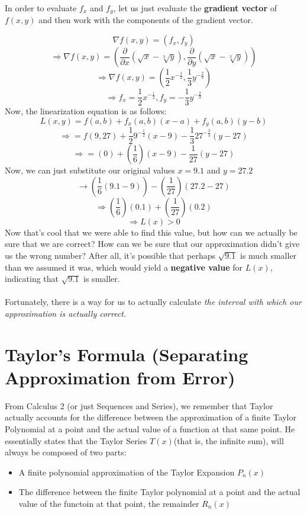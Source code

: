 \documentclass{report}
\begin{document}
\begin{sloppypar}
In order to evaluate $f_{x}$ and $ f_{y}$, let us
just evaluate the \textbf{gradient vector} of
$ f(x,y)$ and then work with the components
of the gradient vector.

\[ \nabla f(x,y) = \left( f_{x}, f_{y} \right)\]
\[ \Rightarrow \nabla f(x,y) = \left( \frac{\partial}{\partial x} \left( \sqrt{x} -
      \sqrt[3]{y} \right), \frac{\partial}{\partial y}
    \left( \sqrt{x} - \sqrt[3]{y} \right)\right)\]
\[ \Rightarrow \nabla f(x,y) =
  \left( \frac{1}{2}x^{-\frac{1}{2}},
    \frac{1}{3}y^{-\frac{2}{3}}\right)\]
\[ \Rightarrow f_{x} = \frac{1}{2}x^{-\frac{1}{2}},
  f_{y} = -\frac{1}{3}y^{-\frac{2}{3}}\]
Now, the linearization equation is as follows:
\[ L(x,y) = f(a,b) + f_{x}(a,b)(x-a) + f_{y}(a,b)(y-b)\]
\[ \Rightarrow = f(9,27) + \frac{1}{2}9^{-\frac{1}{2}}(x-9) - \frac{1}{3}27^{-\frac{2}{3}}(y-27) \]
\[ \Rightarrow = (0) + (\frac{1}{6})(x-9) - \frac{1}{27}(y-27)\]
Now, we can just substitute our original values
$x = 9.1$ and $ y = 27.2$
\[ \rightarrow \left( \frac{1}{6} (9.1-9) \right)
  - \left( \frac{1}{27} \right) (27.2-27) \]
\[ \Rightarrow \left( \frac{1}{6} \right) (0.1) +
  \left( \frac{1}{27} \right) (0.2) \]
\[ \Rightarrow L(x) > 0 \]
Now that's cool that we were able to find this
value, but how can we actually be sure that
we are correct? How can we be sure that our
approximation didn't give us the wrong number? After
all, it's possible that perhaps $\sqrt{9.1}$ is
much smaller than we assumed it was, which would
yield a \textbf{negative value} for $L(x)$,
indicating that $\sqrt{9.1}$ is smaller. \\ \\
Fortunately, there is a way for us to actually
calculate \textit{the interval with which our
approximation is actually correct}.
\section{Taylor's Formula (Separating Approximation from Error)}
From Calculus 2 (or just Sequences and Series),
we remember that Taylor actually accounts for
the difference between the approximation of a
finite Taylor Polynomial at a point and the actual
value of a function at that same point. He essentially
states that the Taylor Series $T(x) $(that is, the infinite
sum), will always be composed of two parts:
\begin{itemize}
  \item A finite polynomial approximation of the
        Taylor Expansion $ P_{n}(x)$
  \item The difference between the finite Taylor
        polynomial at a point
        and the actual value of the functoin
        at that point, the remainder $ R_{n}(x)$


\end{itemize}
\end{sloppypar}
\end{document}
